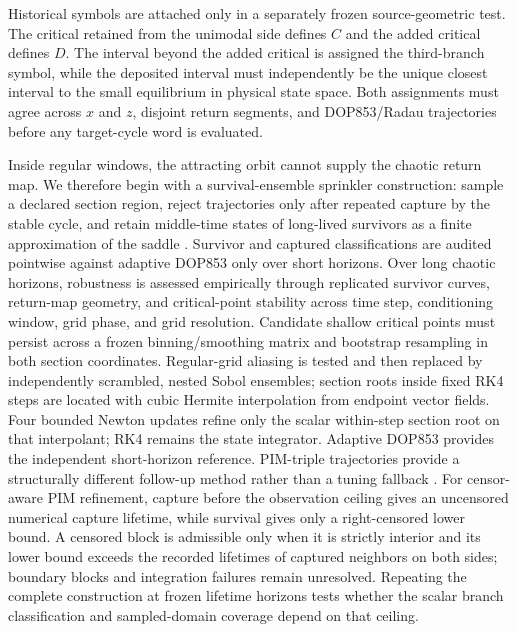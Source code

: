 Historical symbols are attached only in a separately frozen source-geometric
test.  The critical retained from the unimodal side defines $C$ and the added
critical defines $D$.  The interval beyond the added critical is assigned the
third-branch symbol, while the deposited interval must independently be the
unique closest interval to the small equilibrium in physical state space.
Both assignments must agree across $x$ and $z$, disjoint return segments, and
DOP853/Radau trajectories before any target-cycle word is evaluated.

Inside regular windows, the attracting orbit cannot supply the chaotic return
map.  We therefore begin with a survival-ensemble sprinkler construction:
sample a declared section region, reject trajectories only after repeated
capture by the stable cycle, and retain middle-time states of long-lived
survivors as a finite approximation of the saddle
\citep{kantz1985repellers}.  Survivor and captured classifications are audited
pointwise against adaptive DOP853 only over short horizons.  Over long chaotic
horizons, robustness is assessed empirically through replicated survivor curves,
return-map geometry, and critical-point stability across time step,
conditioning window, grid phase, and grid resolution.  Candidate shallow
critical points must persist across a frozen binning/smoothing matrix and
bootstrap resampling in both section coordinates.  Regular-grid aliasing is
tested and then replaced by independently scrambled, nested Sobol ensembles;
section roots inside fixed RK4 steps are located with cubic Hermite
interpolation from endpoint vector fields.  Four bounded Newton updates refine
only the scalar within-step section root on that interpolant; RK4 remains the
state integrator.  Adaptive DOP853 provides the independent short-horizon
reference.  PIM-triple trajectories
provide a structurally different follow-up method rather than a tuning fallback
\citep{nusse1989procedure}.  For censor-aware PIM refinement, capture before
the observation ceiling gives an uncensored numerical capture lifetime, while
survival gives only a right-censored lower bound. A censored block is admissible only when it is
strictly interior and its lower bound exceeds the recorded lifetimes of captured
neighbors on both sides; boundary blocks and integration failures remain
unresolved.  Repeating the complete construction at frozen lifetime horizons
tests whether the scalar branch classification and sampled-domain coverage
depend on that ceiling.

